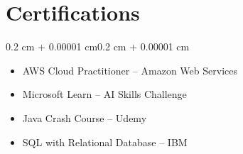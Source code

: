 \documentclass[10pt, letterpaper]{article}
\newenvironment{highlights}{
    \begin{itemize}[
        topsep=0.05cm,
        parsep=0pt,
        partopsep=0pt,
        itemsep=1pt,
        leftmargin=0.4 cm + 10pt
    ]
}{
    \end{itemize}
}
\newenvironment{onecolentry}{
    \begin{adjustwidth}{0.2 cm + 0.00001 cm}{0.2 cm + 0.00001 cm}
}{
    \end{adjustwidth}
}
\begin{document}
\section{Certifications}

\begin{onecolentry}
\begin{highlights}
\item AWS Cloud Practitioner -- Amazon Web Services
\item Microsoft Learn -- AI Skills Challenge
\item Java Crash Course -- Udemy
\item SQL with Relational Database -- IBM
\end{highlights}
\end{onecolentry}
\end{document}
